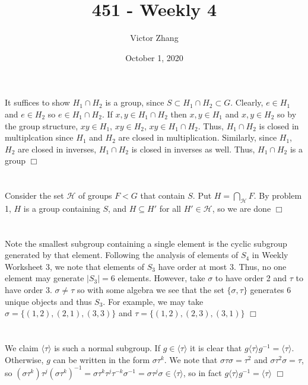 \documentclass{article}
\title{451 - Weekly 4}
\author{Victor Zhang}
\date{October 1, 2020}
\begin{document}
\maketitle

\section{}
It suffices to show $H_1 \cap H_2$ is a group, since $S \subset H_1 \cap H_2 \subset G$. Clearly, $e \in H_1$ and $e \in H_2$ so $e \in H_1 \cap H_2$. If $x,y \in H_1 \cap H_2$ then $x,y \in H_1$ and $x,y \in H_2$ so by the group structure, $xy \in H_1$, $xy \in H_2$, $xy \in H_1 \cap H_2$. Thus, $H_1 \cap H_2$ is closed in multiplcation since $H_1$ and $H_2$ are closed in multiplication. Similarly, since $H_1$, $H_2$ are closed in inverses, $H_1 \cap H_2$ is closed in inverses as well. Thus, $H_1 \cap H_2$ is a group $\Box$

\section{}
Consider the set $\mathcal{H}$ of groups $F < G$ that contain $S$. Put $H = \bigcap\limits_{\mathcal{H}} F$. By problem 1, $H$ is a group containing $S$, and $H \subseteq H'$ for all $H' \in \mathcal{H}$, so we are done $\Box$

\section{}
Note the smallest subgroup containing a single element is the cyclic subgroup generated by that element. Following the analysis of elements of $S_4$ in Weekly Worksheet 3, we note that elements of $S_3$ have order at most 3. Thus, no one element may generate $|S_3| = 6$ elements. However, take $\sigma$ to have order 2 and $\tau$ to have order 3. $\sigma \neq \tau$ so with some algebra we see that the set $\{\sigma, \tau\}$ generates 6 unique objects and thus $S_3$. For example, we may take $\sigma = \{(1,2), (2,1), (3,3)\}$ and $\tau = \{(1,2),(2,3),(3,1)\}$ $\Box$

\section{}
We claim $\langle \tau \rangle$ is such a normal subgroup. If $g \in \langle \tau \rangle$ it is clear that $g \langle \tau \rangle g^{-1} = \langle \tau \rangle$. Otherwise, $g$ can be written in the form $\sigma\tau^k$. We note that $\sigma\tau\sigma = \tau^2$ and $\sigma\tau^2\sigma = \tau$, so $(\sigma\tau^k) \tau^j (\sigma\tau^k)^{-1} = \sigma\tau^k\tau^j\tau^{-k}\sigma^{-1} = \sigma\tau^j\sigma \in \langle \tau \rangle$, so in fact $g \langle \tau \rangle g^{-1} = \langle \tau \rangle$ $\Box$
\end{document}
